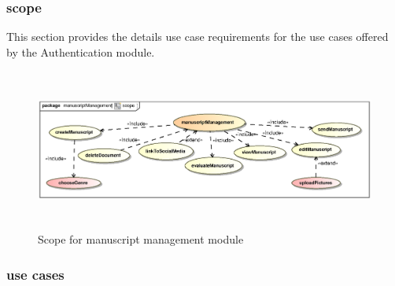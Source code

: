 \documentclass[12pt]{article}
\begin{document}
\subsubsection{scope}
\par{This section provides the details use case requirements for the use cases offered by the Authentication
module.}
\begin{figure}[h]
	\includegraphics[height=200px, width=500px]{epsImages/ManuscriptManagement/manuscriptManagement.eps}
	\caption{Scope for manuscript management module}
\end{figure}
\subsubsection{use cases}
\end{document}
